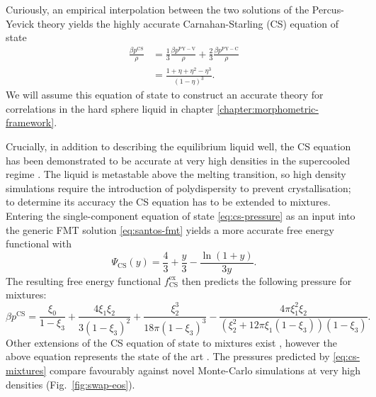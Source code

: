 Curiously, an empirical interpolation between the two solutions of the Percus-Yevick theory yields the highly accurate Carnahan-Starling (CS) equation of state \cite{CarnahanJCP1969}
\begin{equation}\label{eq:cs-pressure}
  \begin{split}
    \frac{\beta p^\mathrm{CS}}{\rho}
    &=
    \frac{1}{3} \frac{\beta p^\mathrm{PY-V}}{\rho}
    + \frac{2}{3} \frac{\beta p^\mathrm{PY-C}}{\rho}
    \\ &=
    \frac{1 + \eta + \eta^2 - \eta^3}{(1-\eta)^3}.
  \end{split}
\end{equation}
We will assume this equation of state to construct an accurate theory for correlations in the hard sphere liquid in chapter \ref{chapter:morphometric-framework}.

Crucially, in addition to describing the equilibrium liquid well, the CS equation has been demonstrated to be accurate at very high densities in the supercooled regime \cite{BerthierPRL2016}.
The liquid is metastable above the melting transition, so high density simulations require the introduction of polydispersity%
to prevent crystallisation; to determine its accuracy the CS equation has to be extended to mixtures.
Entering the single-component equation of state \eqref{eq:cs-pressure} as an input into the generic FMT solution \eqref{eq:santos-fmt} yields a more accurate free energy functional with \cite{SantosPRE2012}
\begin{equation}\label{eq:cs-fmt}
  \Psi_\mathrm{CS}(y)
  =
  \frac{4}{3} + \frac{y}{3} - \frac{\ln{(1 + y)}}{3y}.
\end{equation}
The resulting free energy functional $f^\mathrm{ex}_\mathrm{CS}$ then predicts the following pressure for mixtures: \cite{SantosPRE2012}
\begin{equation}\label{eq:cs-mixtures}
  \beta p^\mathrm{CS}
  =
  \frac{\xi_0}{1 - \xi_3}
  + \frac{4 \xi_1 \xi_2}{3 (1 - \xi_3)^2}
  + \frac{\xi_2^3}{18 \pi (1 - \xi_3)^3}
  - \frac{4 \pi \xi_1^2 \xi_2}{(\xi_2^2 + 12\pi \xi_1 (1 - \xi_3)) (1 - \xi_3)}.
\end{equation}
Other extensions of the CS equation of state to mixtures exist%
,
however the above equation represents the state of the art \cite{SantosPRE2012}.
The pressures predicted by \eqref{eq:cs-mixtures} compare favourably against novel Monte-Carlo simulations at very high densities (Fig.\ \ref{fig:swap-eos}).

